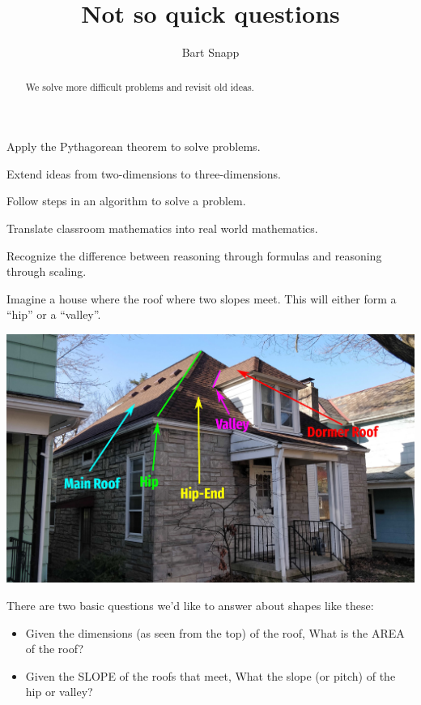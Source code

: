 \documentclass[hints,nooutcomes,noauthor,handout]{ximera}
\title{Not so quick questions}
\author{Bart Snapp}
\begin{document}
\begin{abstract}
  We solve more difficult problems and revisit old ideas.
\end{abstract}
\maketitle


\begin{listOutcomes}
\item Apply the Pythagorean theorem to solve problems.
\item Extend ideas from two-dimensions to three-dimensions.
\item Follow steps in an algorithm to solve a problem.
\item Translate classroom mathematics into real world mathematics.
\item Recognize the difference between reasoning through formulas and
  reasoning through scaling.
\end{listOutcomes}


Imagine a house where the roof where two slopes meet. This will either
form a ``hip'' or a ``valley''.
\begin{center}
  \includegraphics[width=.8\textwidth]{house.jpg}
\end{center}
There are two basic questions we'd like to answer about shapes like these:
\begin{itemize}
\item Given the dimensions (as seen from the top) of the roof, What is the AREA of the roof?
\item Given the SLOPE of the roofs that meet, What the slope (or
  pitch) of the hip or valley?
\end{itemize}


\mynewpage
\end{document}
